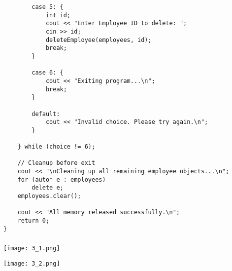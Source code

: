 \documentclass[12pt,a4paper]{article}
\begin{document}
\begin{lstlisting}
        case 5: {
            int id;
            cout << "Enter Employee ID to delete: ";
            cin >> id;
            deleteEmployee(employees, id);
            break;
        }

        case 6: {
            cout << "Exiting program...\n";
            break;
        }

        default:
            cout << "Invalid choice. Please try again.\n";
        }

    } while (choice != 6);

    // Cleanup before exit
    cout << "\nCleaning up all remaining employee objects...\n";
    for (auto* e : employees)
        delete e;
    employees.clear();

    cout << "All memory released successfully.\n";
    return 0;
}

\end{lstlisting}

\subsubsection{}
\begin{center}
    \texttt{[image: 3\_1.png]}
\end{center}

\begin{center}
    \texttt{[image: 3\_2.png]}
\end{center}
\end{document}
